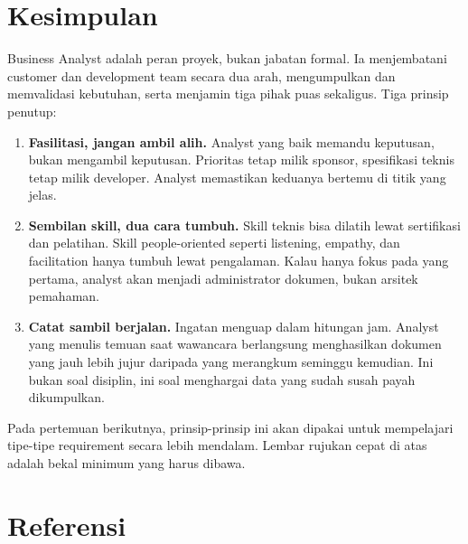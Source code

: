 \documentclass[11pt,a4paper]{article}
\begin{document}
\section{Kesimpulan}

Business Analyst adalah peran proyek, bukan jabatan formal. Ia menjembatani customer dan development team secara dua arah, mengumpulkan dan memvalidasi kebutuhan, serta menjamin tiga pihak puas sekaligus. Tiga prinsip penutup:

\begin{enumerate}
	\item \textbf{Fasilitasi, jangan ambil alih.} Analyst yang baik memandu keputusan, bukan mengambil keputusan. Prioritas tetap milik sponsor, spesifikasi teknis tetap milik developer. Analyst memastikan keduanya bertemu di titik yang jelas.
	\item \textbf{Sembilan skill, dua cara tumbuh.} Skill teknis bisa dilatih lewat sertifikasi dan pelatihan. Skill people-oriented seperti listening, empathy, dan facilitation hanya tumbuh lewat pengalaman. Kalau hanya fokus pada yang pertama, analyst akan menjadi administrator dokumen, bukan arsitek pemahaman.
	\item \textbf{Catat sambil berjalan.} Ingatan menguap dalam hitungan jam. Analyst yang menulis temuan saat wawancara berlangsung menghasilkan dokumen yang jauh lebih jujur daripada yang merangkum seminggu kemudian. Ini bukan soal disiplin, ini soal menghargai data yang sudah susah payah dikumpulkan.
\end{enumerate}

Pada pertemuan berikutnya, prinsip-prinsip ini akan dipakai untuk mempelajari tipe-tipe requirement secara lebih mendalam. Lembar rujukan cepat di atas adalah bekal minimum yang harus dibawa.

\newpage
\section*{Referensi}
\end{document}
